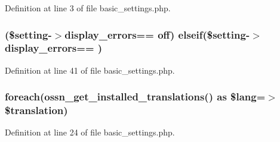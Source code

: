Definition at line 3 of file basic\+\_\+settings.\+php.

\subsubsection[{\texorpdfstring{elseif}{elseif}}]{ (\$setting-\/$>$display\+\_\+errors== \textquotesingle{}off\textquotesingle{}) elseif(\$setting-\/$>$display\+\_\+errors== \textquotesingle{})}\hypertarget{forms_2admin_2basic__settings_8php_a3bc58acf2cd4d036700e61b154e8c491}{}\label{forms_2admin_2basic__settings_8php_a3bc58acf2cd4d036700e61b154e8c491}


Definition at line 41 of file basic\+\_\+settings.\+php.

\subsubsection[{\texorpdfstring{foreach}{foreach}}]{\setlength{\rightskip}{0pt plus 5cm}foreach({\bf ossn\+\_\+get\+\_\+installed\+\_\+translations}() as \$lang=$>$ \$translation)}\hypertarget{forms_2admin_2basic__settings_8php_a490dbe42351a459cadfd198629bf5a92}{}\label{forms_2admin_2basic__settings_8php_a490dbe42351a459cadfd198629bf5a92}


Definition at line 24 of file basic\+\_\+settings.\+php.

